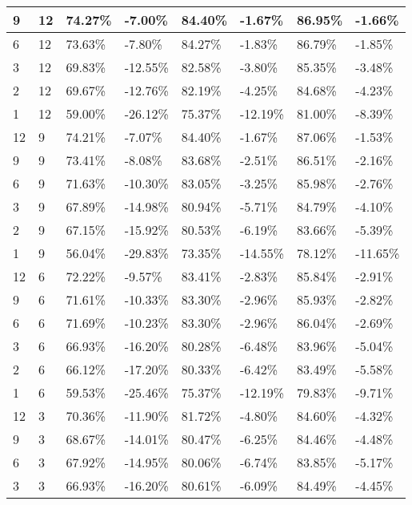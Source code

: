\begin{table}[!htb]
{\begin{tabular}{|l|l|l|l|l|l|l|l|}
        9 & 12 & 74.27\% & -7.00\% & 84.40\% & -1.67\% & 86.95\% & -1.66\% \\ \hline
        6 & 12 & 73.63\% & -7.80\% & 84.27\% & -1.83\% & 86.79\% & -1.85\% \\ \hline
        3 & 12 & 69.83\% & -12.55\% & 82.58\% & -3.80\% & 85.35\% & -3.48\% \\ \hline
        2 & 12 & 69.67\% & -12.76\% & 82.19\% & -4.25\% & 84.68\% & -4.23\% \\ \hline
        1 & 12 & 59.00\% & -26.12\% & 75.37\% & -12.19\% & 81.00\% & -8.39\% \\ \hline
        \midrule
        12 & 9 & 74.21\% & -7.07\% & 84.40\% & -1.67\% & 87.06\% & -1.53\% \\ \hline
        9 & 9 & 73.41\% & -8.08\% & 83.68\% & -2.51\% & 86.51\% & -2.16\% \\ \hline
        6 & 9 & 71.63\% & -10.30\% & 83.05\% & -3.25\% & 85.98\% & -2.76\% \\ \hline
        3 & 9 & 67.89\% & -14.98\% & 80.94\% & -5.71\% & 84.79\% & -4.10\% \\ \hline
        2 & 9 & 67.15\% & -15.92\% & 80.53\% & -6.19\% & 83.66\% & -5.39\% \\ \hline
        1 & 9 & 56.04\% & -29.83\% & 73.35\% & -14.55\% & 78.12\% & -11.65\% \\ \hline
        \midrule
        12 & 6 & 72.22\% & -9.57\% & 83.41\% & -2.83\% & 85.84\% & -2.91\% \\ \hline
        9 & 6 & 71.61\% & -10.33\% & 83.30\% & -2.96\% & 85.93\% & -2.82\% \\ \hline
        6 & 6 & 71.69\% & -10.23\% & 83.30\% & -2.96\% & 86.04\% & -2.69\% \\ \hline
        3 & 6 & 66.93\% & -16.20\% & 80.28\% & -6.48\% & 83.96\% & -5.04\% \\ \hline
        2 & 6 & 66.12\% & -17.20\% & 80.33\% & -6.42\% & 83.49\% & -5.58\% \\ \hline
        1 & 6 & 59.53\% & -25.46\% & 75.37\% & -12.19\% & 79.83\% & -9.71\% \\ \hline
        \midrule
        12 & 3 & 70.36\% & -11.90\% & 81.72\% & -4.80\% & 84.60\% & -4.32\% \\ \hline
        9 & 3 & 68.67\% & -14.01\% & 80.47\% & -6.25\% & 84.46\% & -4.48\% \\ \hline
        6 & 3 & 67.92\% & -14.95\% & 80.06\% & -6.74\% & 83.85\% & -5.17\% \\ \hline
        3 & 3 & 66.93\% & -16.20\% & 80.61\% & -6.09\% & 84.49\% & -4.45\% \\ \hline

\end{tabular}}
\end{table}
